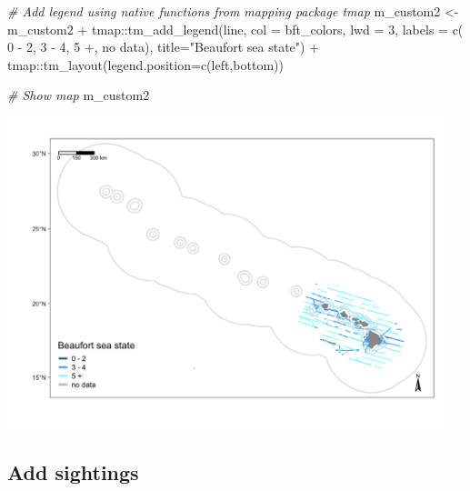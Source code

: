 \documentclass[
]{book}
\newenvironment{Shaded}{\begin{snugshade}}{\end{snugshade}}
\newcommand{\AttributeTok}[1]{\textcolor[rgb]{0.77,0.63,0.00}{#1}}
\newcommand{\CommentTok}[1]{\textcolor[rgb]{0.56,0.35,0.01}{\textit{#1}}}
\newcommand{\DecValTok}[1]{\textcolor[rgb]{0.00,0.00,0.81}{#1}}
\newcommand{\FunctionTok}[1]{\textcolor[rgb]{0.00,0.00,0.00}{#1}}
\newcommand{\NormalTok}[1]{#1}
\newcommand{\OtherTok}[1]{\textcolor[rgb]{0.56,0.35,0.01}{#1}}
\newcommand{\SpecialCharTok}[1]{\textcolor[rgb]{0.00,0.00,0.00}{#1}}
\newcommand{\StringTok}[1]{\textcolor[rgb]{0.31,0.60,0.02}{#1}}
\begin{document}
\begin{Shaded}
\begin{Highlighting}[]
\CommentTok{\# Add legend using native functions from mapping package \textasciigrave{}tmap\textasciigrave{}}
\NormalTok{m\_custom2 }\OtherTok{\textless{}{-}} 
\NormalTok{  m\_custom2 }\SpecialCharTok{+} 
\NormalTok{  tmap}\SpecialCharTok{::}\FunctionTok{tm\_add\_legend}\NormalTok{(}\StringTok{\textquotesingle{}line\textquotesingle{}}\NormalTok{, }
                        \AttributeTok{col =}\NormalTok{ bft\_colors,}
                        \AttributeTok{lwd =} \DecValTok{3}\NormalTok{,}
                        \AttributeTok{labels =} \FunctionTok{c}\NormalTok{(}\StringTok{\textquotesingle{} 0 {-} 2\textquotesingle{}}\NormalTok{, }
                                   \StringTok{\textquotesingle{} 3 {-} 4\textquotesingle{}}\NormalTok{, }
                                   \StringTok{\textquotesingle{} 5 +\textquotesingle{}}\NormalTok{, }
                                   \StringTok{\textquotesingle{} no data\textquotesingle{}}\NormalTok{),}
                         \AttributeTok{title=}\StringTok{"Beaufort sea state"}\NormalTok{) }\SpecialCharTok{+}
\NormalTok{  tmap}\SpecialCharTok{::}\FunctionTok{tm\_layout}\NormalTok{(}\AttributeTok{legend.position=}\FunctionTok{c}\NormalTok{(}\StringTok{\textquotesingle{}left\textquotesingle{}}\NormalTok{,}\StringTok{\textquotesingle{}bottom\textquotesingle{}}\NormalTok{))}

\CommentTok{\# Show map}
\NormalTok{m\_custom2}
\end{Highlighting}
\end{Shaded}

\includegraphics[width=0.95\textwidth,height=\textheight]{img/map_tracks3.png}

\hypertarget{add-sightings}{%
\subsection*{Add sightings}\label{add-sightings}}
\end{document}
